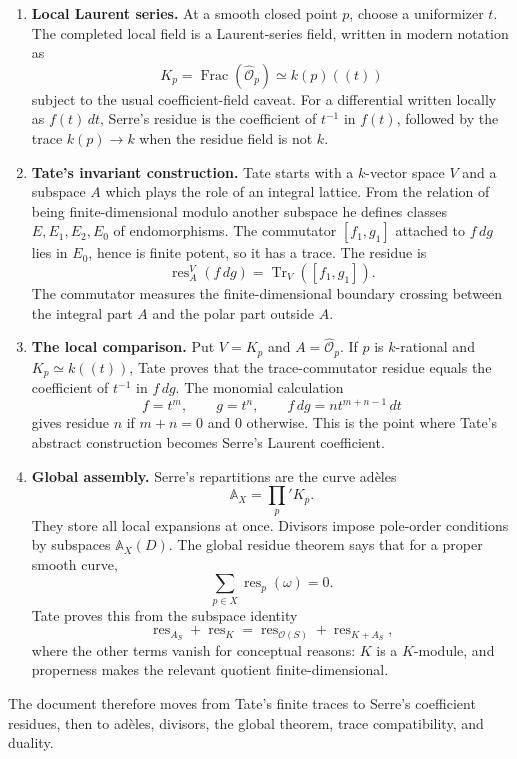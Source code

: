 \documentclass[11pt,a4paper]{article}
\newcommand{\OO}{\mathcal O}
\newcommand{\wideO}{\widehat{\mathcal O}}
\newcommand{\AX}{\mathbb A_X}
\newcommand{\Frac}{\operatorname{Frac}}
\newcommand{\res}{\operatorname{res}}
\newcommand{\Tr}{\operatorname{Tr}}
\theoremstyle{definition}
\theoremstyle{plain}
\theoremstyle{remark}
\begin{document}
\begin{enumerate}
\item \textbf{Local Laurent series.}  At a smooth closed point $p$, choose a uniformizer $t$.  The completed local field is a Laurent-series field, written in modern notation as
\[
  K_p=\Frac(\wideO_p) \simeq k(p)((t))
\]
subject to the usual coefficient-field caveat.  For a differential written locally as $f(t)\,dt$, Serre's residue is the coefficient of $t^{-1}$ in $f(t)$, followed by the trace $k(p) \to k$ when the residue field is not $k$.

\item \textbf{Tate's invariant construction.}  Tate starts with a $k$-vector space $V$ and a subspace $A$ which plays the role of an integral lattice.  From the relation of being finite-dimensional modulo another subspace he defines classes $E,E_1,E_2,E_0$ of endomorphisms.  The commutator $[f_1,g_1]$ attached to $f\,dg$ lies in $E_0$, hence is finite potent, so it has a trace.  The residue is
\[
  \res_A^V(f\,dg)=\Tr_V([f_1,g_1]).
\]
The commutator measures the finite-dimensional boundary crossing between the integral part $A$ and the polar part outside $A$.

\item \textbf{The local comparison.}  Put $V=K_p$ and $A=\wideO_p$.  If $p$ is $k$-rational and $K_p\simeq k((t))$, Tate proves that the trace-commutator residue equals the coefficient of $t^{-1}$ in $f\,dg$.  The monomial calculation
\[
  f=t^m,\qquad g=t^n,
  \qquad f\,dg=n t^{m+n-1}\,dt
\]
gives residue $n$ if $m+n=0$ and $0$ otherwise.  This is the point where Tate's abstract construction becomes Serre's Laurent coefficient.

\item \textbf{Global assembly.}  Serre's repartitions are the curve adèles
\[
  \AX=\prod_p'K_p.
\]
They store all local expansions at once.  Divisors impose pole-order conditions by subspaces $\AX(D)$.  The global residue theorem says that for a proper smooth curve,
\[
  \sum_{p\in X}\res_p(\omega)=0.
\]
Tate proves this from the subspace identity
\[
  \res_{A_S}+\res_K=\res_{\OO(S)}+\res_{K+A_S},
\]
where the other terms vanish for conceptual reasons: $K$ is a $K$-module, and properness makes the relevant quotient finite-dimensional.
\end{enumerate}

The document therefore moves from Tate's finite traces to Serre's coefficient residues, then to adèles, divisors, the global theorem, trace compatibility, and duality.
\end{document}
